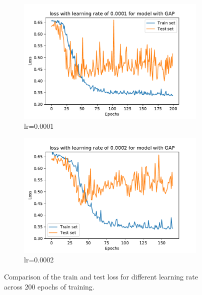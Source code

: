 \begin{figure}
\begin{subfigure}[b]{0.475\textwidth}
        \includegraphics[width=\textwidth]{figures/Experiements/training_3D_CNN_GAP_lr_0.0001.pdf}
        \caption[]%
        {{\small lr=0.0001}}    
    \end{subfigure}
    \quad
    \begin{subfigure}[b]{0.475\textwidth}   
        \centering 
        \includegraphics[width=\textwidth]{figures/Experiements/training_3D_CNN_GAP_lr_0.0002.pdf}
        \caption[]%
        {{\small lr=0.0002}}    
    \end{subfigure}
    \caption[ The average and standard deviation of critical parameters ]
    {\small Comparison of the train and test loss for different learning rate across 200 epochs of training. } 
    \label{fig:fine_tune_learning_rate}
\end{figure}


